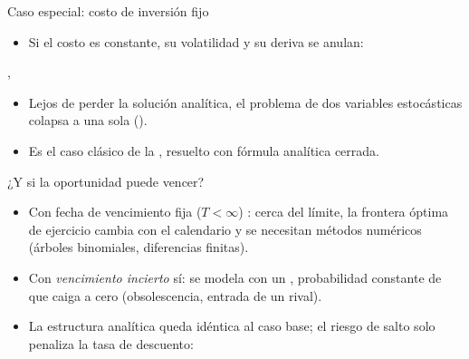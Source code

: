 \begin{frame}{Caso especial: costo de inversión fijo}
  \begin{itemize}
    \item Si el costo  es constante, su volatilidad y su deriva se
          anulan:
  \end{itemize}
  \begin{ecmed}
    , \qquad {}
  \end{ecmed}
  \begin{itemize}
    \item Lejos de perder la solución analítica, el problema de dos variables
          estocásticas colapsa a una sola ().
    \item Es el caso clásico de la ,
          resuelto con fórmula analítica cerrada.
  \end{itemize}
\end{frame}

\begin{frame}{¿Y si la oportunidad puede vencer?}
  \begin{itemize}
    \item Con fecha de vencimiento fija ($T<\infty$) : cerca del límite, la frontera óptima de
          ejercicio cambia con el calendario y se necesitan métodos numéricos
          (árboles binomiales, diferencias finitas).
    \item Con \emph{vencimiento incierto} sí: se modela con un
          , probabilidad constante 
          de que  caiga a cero (obsolescencia, entrada de un rival).
    \item La estructura analítica queda idéntica al caso base; el riesgo de
          salto solo penaliza la tasa de descuento:
  \end{itemize}
  \cajaec{\az{\mu} \;\longrightarrow\; \rj{\mu + \lambda}}
\end{frame}

